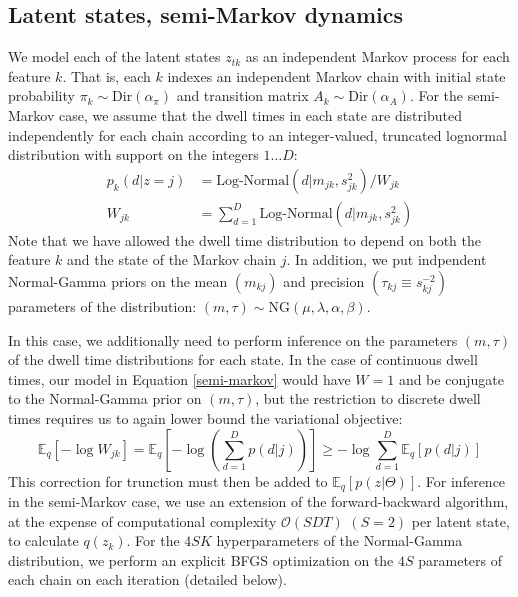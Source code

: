 \documentclass[10pt,letterpaper]{article}
\begin{document}
\subsection{Latent states, semi-Markov dynamics}

We model each of the latent states $z_{tk}$ as an independent Markov process for each feature $k$. That is, each $k$ indexes an independent Markov chain with initial state probability $\pi_k\sim \text{Dir}(\alpha_\pi)$ and transition matrix $A_k\sim \text{Dir}(\alpha_A)$. For the semi-Markov case, we assume that the dwell times in each state are distributed independently for each chain according to an integer-valued, truncated lognormal distribution with support on the integers $1\dots D$:
\begin{align}
    \label{semi-markov}
    p_k(d|z = j) &= \text{Log-Normal}(d|m_{jk}, s^2_{jk}) / W_{jk}  \\
    W_{jk} &= \sum_{d = 1}^D \text{Log-Normal}(d|m_{jk}, s^2_{jk})
\end{align}
Note that we have allowed the dwell time distribution to depend on both the feature $k$ and the state of the Markov chain $j$. In addition, we put indpendent Normal-Gamma priors on the mean $(m_{kj})$ and precision $(\tau_{kj} \equiv s_{kj}^{-2})$ parameters of the distribution: $(m, \tau) \sim \text{NG}(\mu, \lambda, \alpha, \beta)$.

In this case, we additionally need to perform inference on the parameters $(m, \tau)$ of the dwell time distributions for each state. In the case of continuous dwell times, our model in Equation \ref{semi-markov} would have $W = 1$ and be conjugate to the Normal-Gamma prior on $(m, \tau)$, but the restriction to discrete dwell times requires us to again lower bound the variational objective:
\begin{equation}
    \mathbb{E}_q\left[-\log W_{jk} \right] =
    \mathbb{E}_q\left[- \log \left( \sum_{d=1}^D p(d|j)\right) \right]
    \ge -\log \sum_{d = 1}^D \mathbb{E}_q\left[p(d|j)\right]
\end{equation}
This correction for trunction must then be added to $\mathbb{E}_q[p(z|\Theta)]$. For inference in the semi-Markov case, we use an extension of the forward-backward algorithm\cite{Yu2006-bb}, at the expense of computational complexity $\mathcal{O}(SDT)$ $(S = 2)$ per latent state, to calculate $q(z_k)$. For the $4SK$ hyperparameters of the Normal-Gamma distribution, we perform an explicit BFGS optimization on the $4S$ parameters of each chain on each iteration (detailed below).
\end{document}
